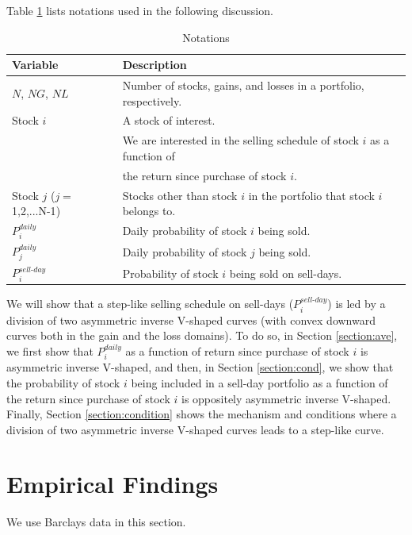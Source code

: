 \documentclass[11pt, a4paper]{article}
\begin{document}
Table \ref{table:notations} lists notations used in the following discussion.

\begin{table}[H]
	\label{table:notations}
	\caption{Notations}
	\centering
	\small
	\begin{tabular}{l l} 
		\hline
		Variable &\:\:\:\:\:\:\:\:\:\:\:\: Description \\
		\hline
		$N$, $NG$, $NL$ & Number of stocks, gains, and losses in a portfolio, respectively.\\
		Stock $i$ & A stock of interest. \\
		& We are interested in the selling schedule of stock $i$ as a function of\\
		& the return since purchase of stock $i$.\\
		Stock $j$ ($j=${1,2,...N-1})& Stocks other than stock $i$ in the portfolio that stock $i$ belongs to.\\
		$P^{daily}_{i}$ & Daily probability of stock $i$ being sold. \\
		$P^{daily}_{j}$ & Daily probability of stock $j$ being sold. \\
		$P^{sell\mbox{-}day}_{i}$ & Probability of stock $i$ being sold on sell-days.\\
		\hline
	\end{tabular}
\end{table}

We will show that a step-like selling schedule on sell-days ($P^{sell\mbox{-}day}_{i}$) is led by a division of two asymmetric inverse V-shaped curves (with convex downward curves both in the gain and the loss domains). To do so, in Section \ref{section:ave}, we first show that $P^{daily}_{i}$ as a function of return since purchase of stock $i$ is asymmetric inverse V-shaped, and then, in Section \ref{section:cond}, we show that the probability of stock $i$ being included in a sell-day portfolio as a function of the return since purchase of stock $i$ is oppositely asymmetric inverse V-shaped. Finally, Section \ref{section:condition} shows the mechanism and conditions where a division of two asymmetric inverse V-shaped curves leads to a step-like curve. 

\section{Empirical Findings}
We use Barclays data in this section. 
\end{document}
